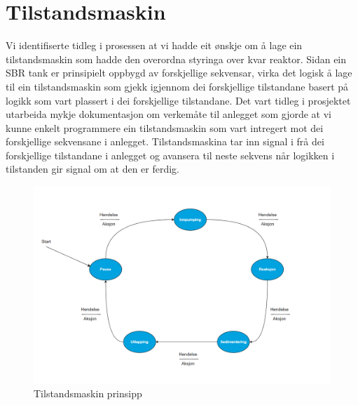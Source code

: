 \section{Tilstandsmaskin}
\thispagestyle{fancy}


Vi identifiserte tidleg i prosessen at vi hadde eit ønskje om å lage ein tilstandsmaskin som hadde den overordna styringa over kvar reaktor. 
Sidan ein SBR tank er prinsipielt oppbygd av forskjellige sekvensar, virka det logisk å lage til ein tilstandsmaskin som gjekk igjennom dei forskjellige tilstandane basert på logikk som vart plassert i dei forskjellige tilstandane. 
Det vart tidleg i prosjektet utarbeida mykje dokumentasjon om verkemåte til anlegget som gjorde at vi kunne enkelt programmere ein tilstandsmaskin som vart intregert mot dei forskjellige sekvensane i anlegget. 
Tilstandsmaskina tar inn signal i frå dei forskjellige tilstandane i anlegget og avansera til neste sekvens når logikken i tilstanden gir signal om at den er ferdig. 

\begin{figure}[htbp]
    \centering
    \includegraphics[width=1\textwidth]{Figurar/Tom tilstandsmaskin.png}
    \caption{Tilstandsmaskin prinsipp}\label{fig:Tilstandsmaskin prinsipp}    
\end{figure}

\newpage

